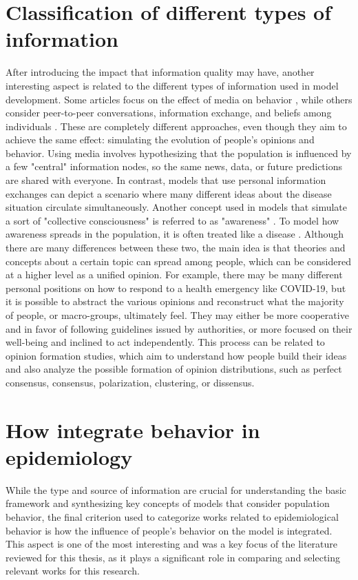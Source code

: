 \section{Classification of different types of information}
After introducing the impact that information quality may have, another interesting aspect is related to the different types of information used in model development. Some articles focus on the effect of media on behavior \cite{Collinson2014, Misra_2011}, while others consider peer-to-peer conversations, information exchange, and beliefs among individuals \cite{Tyson_2020}. These are completely different approaches, even though they aim to achieve the same effect: simulating the evolution of people's opinions and behavior. Using media involves hypothesizing that the population is influenced by a few "central" information nodes, so the same news, data, or future predictions are shared with everyone. In contrast, models that use personal information exchanges can depict a scenario where many different ideas about the disease situation circulate simultaneously.
Another concept used in models that simulate a sort of "collective consciousness" is referred to as "awareness" \cite{Funk2009}. To model how awareness spreads in the population, it is often treated like a disease \cite{Silva2019, Granell2013, Granell_2014, Kabir_2019, Zuo_2021, Wang_2019}. Although there are many differences between these two, the main idea is that theories and concepts about a certain topic can spread among people, which can be considered at a higher level as a unified opinion. For example, there may be many different personal positions on how to respond to a health emergency like COVID-19, but it is possible to abstract the various opinions and reconstruct what the majority of people, or macro-groups, ultimately feel. They may either be more cooperative and in favor of following guidelines issued by authorities, or more focused on their well-being and inclined to act independently.
This process can be related to opinion formation studies, which aim to understand how people build their ideas \cite{Devia_2023, Devia2022} and also analyze the possible formation of opinion distributions, such as perfect consensus, consensus, polarization, clustering, or dissensus.

\section{How integrate behavior in epidemiology}
While the type and source of information are crucial for understanding the basic framework and synthesizing key concepts of models that consider population behavior, the final criterion used to categorize works related to epidemiological behavior is how the influence of people's behavior on the model is integrated. This aspect is one of the most interesting and was a key focus of the literature reviewed for this thesis, as it plays a significant role in comparing and selecting relevant works for this research.

